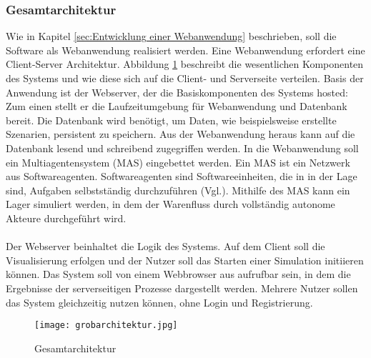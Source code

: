 \subsubsection{Gesamtarchitektur}\label{GA}
Wie in Kapitel \ref{sec:Entwicklung einer Webanwendung} beschrieben, soll die Software als Webanwendung realisiert werden. Eine Webanwendung erfordert eine Client-Server Architektur. Abbildung \ref{Gesamtarchitektur} beschreibt die wesentlichen Komponenten des Systems und wie diese sich auf die Client- und Serverseite verteilen. Basis der Anwendung ist der Webserver, der die Basiskomponenten des Systems hosted: Zum einen stellt er die Laufzeitumgebung für Webanwendung und Datenbank bereit. Die Datenbank wird benötigt, um Daten, wie beispielsweise erstellte Szenarien, persistent zu speichern. Aus der Webanwendung heraus kann auf die Datenbank lesend und schreibend zugegriffen werden. In die Webanwendung soll ein Multiagentensystem (MAS) eingebettet werden. Ein MAS ist ein Netzwerk aus Softwareagenten. Softwareagenten sind Softwareeinheiten, die in in der Lage sind, Aufgaben selbstständig durchzuführen (Vgl.\cite{mas}). Mithilfe des MAS kann ein Lager simuliert werden, in dem der Warenfluss durch vollständig autonome Akteure durchgeführt wird. 
\\\\
Der Webserver beinhaltet die Logik des Systems. Auf dem Client soll die Visualisierung erfolgen und der Nutzer soll das Starten einer Simulation initiieren können. Das System soll von einem Webbrowser aus aufrufbar sein, in dem die Ergebnisse der serverseitigen Prozesse dargestellt werden. Mehrere Nutzer sollen das System gleichzeitig nutzen können, ohne Login und Registrierung.

\begin{figure}[h!]
	\centering
		\texttt{[image: grobarchitektur.jpg]}        
		\caption{Gesamtarchitektur}
	\label{Gesamtarchitektur}
\end{figure} 
\newpage
